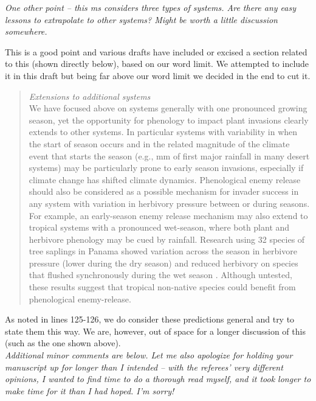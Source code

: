 \documentclass[11pt,a4paper]{letter}
\begin{document}
\begin{letter}{}
\emph{One other point -- this ms considers three types of systems. Are there any easy lessons to extrapolate to other systems? Might be worth a little discussion somewhere.}

This is a good point and various drafts have included or excised a section related to this (shown directly below), based on our word limit. We attempted to include it in this draft but being far above our word limit we decided in the end to cut it. \\

\begin{quote}
\noindent \emph{Extensions to additional systems}\\
\noindent We have focused above on systems generally with one pronounced growing season, yet the opportunity for phenology to impact plant invasions clearly extends to other systems. In particular systems with variability in when the start of season occurs and in the related magnitude of the climate event that starts the season (e.g., mm of first major rainfall in many desert systems) may be particularly prone to early season invasions, especially if climate change has shifted climate dynamics. Phenological enemy release should also be considered as a possible mechanism for invader success in any system with variation in herbivory pressure between or during seasons. For example, an early-season enemy release mechanism may also extend to tropical systems with a pronounced wet-season, where both plant and herbivore phenology may be cued by rainfall. Research using 32 species of tree saplings in Panama showed variation across the season in herbivore pressure (lower during the dry season) and reduced herbivory on species that flushed synchronously during the wet season \citep{aide1993}.  Although untested, these results suggest that tropical non-native species could benefit from phenological enemy-release.
\end{quote}

As noted in lines 125-126, we do consider these predictions general and try to state them this way. We are, however, out of space for a longer discussion of this (such as the one shown above).\\

\emph{Additional minor comments are below. Let me also apologize for holding your manuscript up for longer than I intended -- with the referees' very different opinions, I wanted to find time to do a thorough read myself, and it took longer to make time for it than I had hoped. I'm sorry!}


\end{letter}
\end{document}
